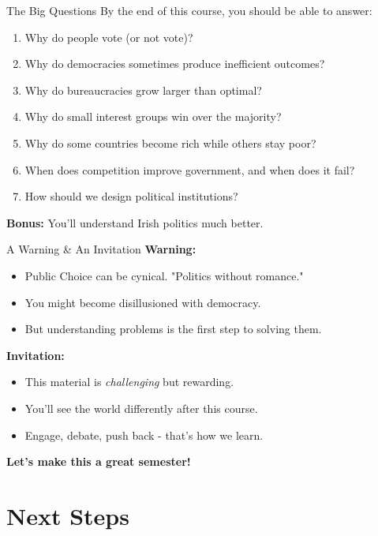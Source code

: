 \documentclass[10pt]{beamer}
\begin{document}
\begin{frame}{The Big Questions}
By the end of this course, you should be able to answer:

\begin{enumerate}
\item Why do people vote (or not vote)?
\item Why do democracies sometimes produce inefficient outcomes?
\item Why do bureaucracies grow larger than optimal?
\item Why do small interest groups win over the majority?
\item Why do some countries become rich while others stay poor?
\item When does competition improve government, and when does it fail?
\item How should we design political institutions?
\end{enumerate}


\textbf{Bonus:} You'll understand Irish politics much better.
\end{frame}

\begin{frame}{A Warning \& An Invitation}
\textbf{Warning:}
\begin{itemize}
\item Public Choice can be cynical. "Politics without romance."
\item You might become disillusioned with democracy.
\item But understanding problems is the first step to solving them.
\end{itemize}

\pause
\vspace{0.5cm}
\textbf{Invitation:}
\begin{itemize}
\item This material is \textit{challenging} but rewarding.
\item You'll see the world differently after this course.
\item Engage, debate, push back - that's how we learn.
\end{itemize}

\pause
\vspace{0.5cm}
\begin{center}
\textbf{Let's make this a great semester!}
\end{center}
\end{frame}

\section{Next Steps}
\end{document}
